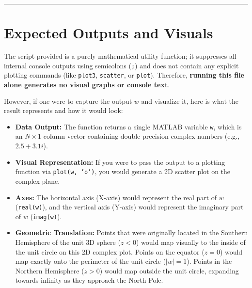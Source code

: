 \vspace{1em}
\hrule
\vspace{1em}

\section{Expected Outputs and Visuals}

The script provided is a purely mathematical utility function; it suppresses all internal console outputs using semicolons (\texttt{;}) and does not contain any explicit plotting commands (like \texttt{plot3}, \texttt{scatter}, or \texttt{plot}). Therefore, \textbf{running this file alone generates no visual graphs or console text}. 

However, if one were to capture the output $w$ and visualize it, here is what the result represents and how it would look:

\begin{itemize}
    \item \textbf{Data Output:} The function returns a single MATLAB variable \texttt{w}, which is an $N \times 1$ column vector containing double-precision complex numbers (e.g., $2.5 + 3.1i$).
    \item \textbf{Visual Representation:} If you were to pass the output to a plotting function via \texttt{plot(w, 'o')}, you would generate a 2D scatter plot on the complex plane. 
    \item \textbf{Axes:} The horizontal axis (X-axis) would represent the real part of $w$ (\texttt{real(w)}), and the vertical axis (Y-axis) would represent the imaginary part of $w$ (\texttt{imag(w)}).
    \item \textbf{Geometric Translation:} Points that were originally located in the Southern Hemisphere of the unit 3D sphere ($z < 0$) would map visually to the inside of the unit circle on this 2D complex plot. Points on the equator ($z = 0$) would map exactly onto the perimeter of the unit circle ($|w| = 1$). Points in the Northern Hemisphere ($z > 0$) would map outside the unit circle, expanding towards infinity as they approach the North Pole.
\end{itemize}
